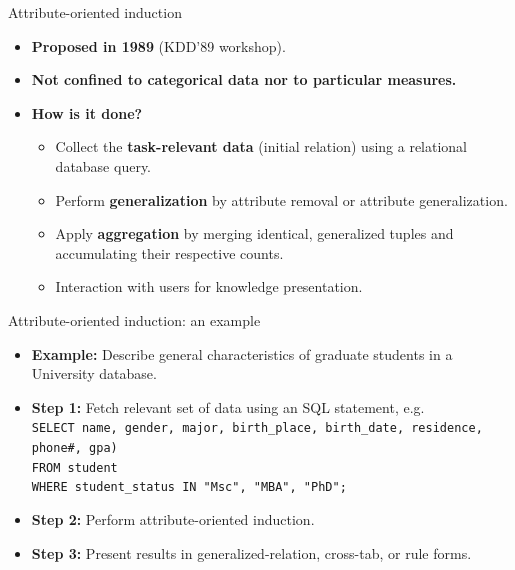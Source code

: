 \documentclass[aspectratio=169,t]{beamer}
\begin{document}
  { 
    \begin{frame}{Attribute-oriented induction}
    \begin{itemize}
      \item \textbf{Proposed in 1989} (KDD'89 workshop).
      \item \textbf{Not confined to categorical data nor to particular measures.}
      \item \textbf{How is it done?}
      \begin{itemize}
        \item Collect the \textbf{\color{airforceblue}task-relevant data} (initial relation) using a relational database query.
        \item Perform \textbf{\color{airforceblue}generalization} by attribute removal or attribute generalization.
        \item Apply \textbf{\color{airforceblue}aggregation} by merging identical, generalized tuples and \\ accumulating their respective counts.
        \item Interaction with users for knowledge presentation.
      \end{itemize}
    \end{itemize}
    \end{frame}
  }

  { 
    \begin{frame}{Attribute-oriented induction: an example}
    \begin{itemize}
      \item \textbf{Example:} Describe general characteristics of graduate students in a University database.
      \item \textbf{Step 1:} Fetch relevant set of data using an SQL statement, e.g.\\[0.1cm]
      \texttt{SELECT name, gender, major, birth\_place, birth\_date, residence, phone\#, gpa)}\\
      \texttt{FROM student}\\
      \texttt{WHERE student\_status IN {"Msc", "MBA", "PhD"};}\\[0.1cm]
      \item \textbf{Step 2:} Perform attribute-oriented induction.
      \item \textbf{Step 3:} Present results in generalized-relation, cross-tab, or rule forms.
    \end{itemize}
    \end{frame}
  }
\end{document}
